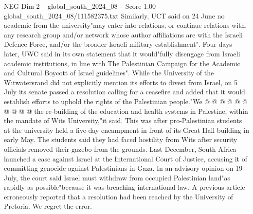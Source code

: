 \begin{textsample}{NEG Dim 2 – global\_south\_2024\_08 – Score 1.00 – global\_south\_2024\_08/111582375.txt}
Similarly, UCT said on 24 June no academic from the university"may enter into relations, or continue relations with, any research group and/or network whose author affiliations are with the Israeli Defence Force, and/or the broader Israeli military establishment".
Four days later, UWC said in its own statement that it would"fully disengage from Israeli academic institutions, in line with The Palestinian Campaign for the Academic and Cultural Boycott of Israel guidelines".
While the University of the Witwatersrand did not explicitly mention its efforts to divest from Israel, on 5 July its senate passed a resolution calling for a ceasefire and added that it would establish efforts to uphold the rights of the Palestinian people."We @ @ @ @ @ @ @ @ @ @ the re-building of the education and health systems in Palestine, within the mandate of Wits University,"it said.
This was after pro-Palestinian students at the university held a five-day encampment in front of its Great Hall building in early May.
The students said they had faced hostility from Wits after security officials removed their gazebo from the grounds.
Last December, South Africa launched a case against Israel at the International Court of Justice, accusing it of committing genocide against Palestinians in Gaza.
In an advisory opinion on 19 July, the court said Israel must withdraw from occupied Palestinian land"as rapidly as possible"because it was breaching international law.
A previous article erroneously reported that a resolution had been reached by the University of Pretoria.
We regret the error.

\end{textsample}

